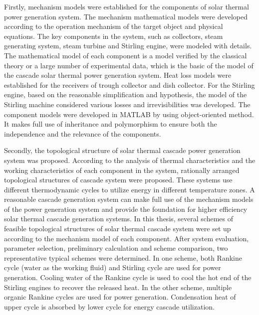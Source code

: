 Firstly, mechanism models were established for the components of solar thermal power generation system. The mechanism mathematical models were developed according to the operation mechanism of the target object and physical equations. The key components in the system, such as collectors, steam generating system, steam turbine and Stirling engine, were modeled with details. The mathematical model of each component is a model verified by the classical theory or a large number of experimental data, which is the basic of the model of the cascade solar thermal power generation system. Heat loss models were established for the receivers of trough collector and dish collector. For the Stirling engine, based on the reasonable simplification and hypothesis, the model of the Stirling machine considered various losses and irrevisibilities was developed. The component models were developed in MATLAB by using object-oriented method. It makes full use of inheritance and polymorphism to ensure both the independence and the relevance of the components.

Secondly, the topological structure of solar thermal cascade power generation system was proposed. According to the analysis of thermal characteristics and the working characteristics of each component in the system, rationally arranged topological structures of cascade system were proposed. These systems use different thermodynamic cycles to utilize energy in different temperature zones. A reasonable cascade generation system can make full use of the mechanism models of the power generation system and provide the foundation for higher efficiency solar thermal cascade generation systems. In this thesis, several schemes of feasible topological structures of solar thermal cascade system were set up according to the mechanism model of each component. After system evaluation, parameter selection, preliminary calculation and scheme comparison, two representative typical schemes were determined. In one scheme, both Rankine cycle (water as the working fluid) and Stirling cycle are used for power generation. Cooling water of the Rankine cycle is used to cool the hot end of the Stirling engines to recover the released heat. In the other scheme, multiple organic Rankine cycles are used for power generation. Condensation heat of upper cycle is absorbed by lower cycle for energy cascade utilization.

